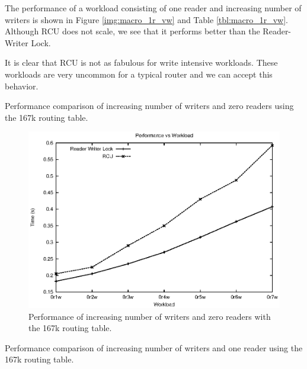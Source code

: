 \documentclass{article}
\begin{document}
The performance of a workload consisting of one reader and increasing number of writers is shown in  Figure \ref{img:macro_1r_vw} and Table \ref{tbl:macro_1r_vw}. Although RCU does not scale, we see that it performs better than the Reader-Writer Lock.

It is clear that RCU is not as fabulous for write intensive workloads. These workloads are very uncommon for a typical router and we can accept this behavior.
 
\begin{table}[tph]
\begin{center}

\end{center}
\caption{Performance comparison of increasing number of writers and zero readers using the 167k routing table.}
\label{tbl:macro_0r_vw}
\end{table}


\begin{figure}[tph]
\includegraphics[scale = 0.6]{../images/graphs/macro_0r_vw}
\caption{Performance of increasing number of writers and zero readers with the 167k routing table.}
\label{img:macro_0r_vw}
\end{figure}


\begin{table}[tph]
\begin{center}

\end{center}
\caption{Performance comparison of increasing number of writers and one reader using the 167k routing table.}
\label{tbl:macro_1r_vw}
\end{table}
\end{document}
